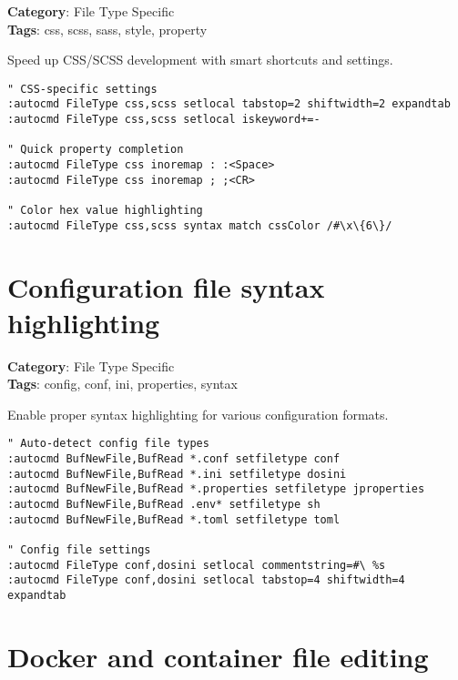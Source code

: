 {{{{{\textbf{Category}: File Type Specific\\ \textbf{Tags}: css, scss, sass, style, property
\vspace{0.5cm}

Speed up CSS/SCSS development with smart shortcuts and settings.

\begin{Exa*}{}
\begin{Verbatim}[fontsize=\footnotesize, breaklines, breakanywhere]
" CSS-specific settings
:autocmd FileType css,scss setlocal tabstop=2 shiftwidth=2 expandtab
:autocmd FileType css,scss setlocal iskeyword+=-

" Quick property completion
:autocmd FileType css inoremap : :<Space>
:autocmd FileType css inoremap ; ;<CR>

" Color hex value highlighting
:autocmd FileType css,scss syntax match cssColor /#\x\{6\}/
\end{Verbatim}
\end{Exa*}

\section{Configuration file syntax highlighting}

\textbf{Category}: File Type Specific\\ \textbf{Tags}: config, conf, ini, properties, syntax
\vspace{0.5cm}

Enable proper syntax highlighting for various configuration formats.

\begin{Exa*}{}
\begin{Verbatim}[fontsize=\footnotesize, breaklines, breakanywhere]
" Auto-detect config file types
:autocmd BufNewFile,BufRead *.conf setfiletype conf
:autocmd BufNewFile,BufRead *.ini setfiletype dosini
:autocmd BufNewFile,BufRead *.properties setfiletype jproperties
:autocmd BufNewFile,BufRead .env* setfiletype sh
:autocmd BufNewFile,BufRead *.toml setfiletype toml

" Config file settings
:autocmd FileType conf,dosini setlocal commentstring=#\ %s
:autocmd FileType conf,dosini setlocal tabstop=4 shiftwidth=4 expandtab
\end{Verbatim}
\end{Exa*}

\section{Docker and container file editing}

}}}}}
